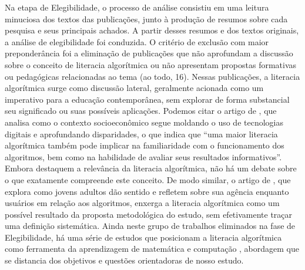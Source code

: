 Na etapa de Elegibilidade, o processo de análise consistiu em uma
leitura minuciosa dos textos das publicações, junto à produção de
resumos sobre cada pesquisa e seus principais achados. A partir desses
resumos e dos textos originais, a análise de elegibilidade foi
conduzida. O critério de exclusão com maior preponderância foi a
eliminação de publicações que não aprofundam a discussão sobre o
conceito de literacia algorítmica ou não apresentam propostas formativas
ou pedagógicas relacionadas ao tema (ao todo, 16). Nessas publicações, a
literacia algorítmica surge como discussão lateral, geralmente acionada
como um imperativo para a educação contemporânea, sem explorar de forma
substancial seu significado ou suas possíveis aplicações. Podemos citar
o artigo de \textcite[p.~759]{Cotter2020}, que analisa como o
contexto socioeconômico segue moldando o uso de tecnologias digitais e
aprofundando disparidades, o que indica que ``uma maior literacia
algorítmica também pode implicar na familiaridade com o funcionamento
dos algoritmos, bem como na habilidade de avaliar seus resultados
informativos''. Embora destaquem a relevância da literacia algorítmica,
não há um debate sobre o que exatamente compreende este conceito. De
modo similar, o artigo de \textcite{Kapsch2022}, que explora como jovens adultos
dão sentido e refletem sobre sua agência enquanto usuários em relação
aos algoritmos, enxerga a literacia algorítmica como um possível
resultado da proposta metodológica do estudo, sem efetivamente traçar
uma definição sistemática. Ainda neste grupo de trabalhos eliminados na
fase de Elegibilidade, há uma série de estudos que posicionam a
literacia algorítmica como ferramenta da aprendizagem de matemática e
computação \cite{Astambayeva2021,How2022}, abordagem que
se distancia dos objetivos e questões orientadoras de nosso estudo.
